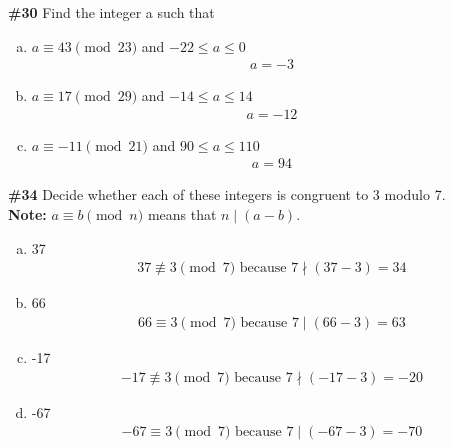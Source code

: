 \documentclass{article}
\newcommand{\problem}[1]{\textbf{\##1}}
\newcommand{\prob}[1]{\problem{#1}}
\begin{document}
\pagebreak

\prob{30}
Find the integer a such that\\
\begin{enumerate}[a)]
    \item \(a \equiv 43\pmod{23}\) and \(-22 \leq a \leq 0\)
    \begin{align*}
        a = -3
    \end{align*}
    \item \(a \equiv 17\pmod{29}\) and \(-14 \leq a \leq 14\)
    \begin{align*}
        a = -12
    \end{align*}
    \item \(a \equiv -11\pmod{21}\) and \(90 \leq a \leq 110\)
    \begin{align*}
        a = 94
    \end{align*}
\end{enumerate}
\pagebreak

\prob{34}
Decide whether each of these integers is congruent to 3 modulo 7.\\
\textbf{Note: } \(a \equiv b \pmod n\) means that \(n \mid (a - b)\).
\begin{enumerate}[a)]
    \item 37
    \begin{align*}
        37 \not \equiv 3 \pmod 7 \text{ because } 7 \nmid (37 - 3) = 34
    \end{align*}
    \item 66
    \begin{align*}
        66 \equiv 3 \pmod 7 \text{ because } 7 \mid (66 - 3) = 63
    \end{align*}
    \item -17
    \begin{align*}
        -17 \not \equiv 3 \pmod 7 \text{ because } 7 \nmid (-17 - 3) = -20
    \end{align*}
    \item -67
    \begin{align*}
        -67 \equiv 3 \pmod 7 \text{ because } 7 \mid (-67 - 3) = -70
    \end{align*}
\end{enumerate}
\pagebreak
\end{document}
